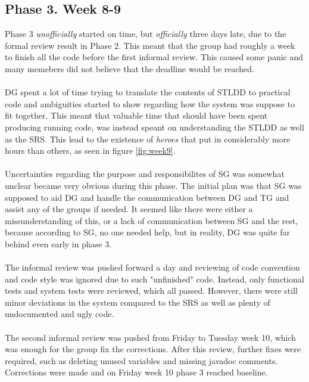 \documentclass{article}
\begin{document}
    \subsection{Phase 3. Week 8-9 \label{phase3}}
        Phase 3 \emph{unofficially} started on time, but \emph{officially} three days late, due to 
        the formal review result in Phase 2. This meant that the group had roughly a week to finish all 
        the code before the first informal review. This caused some panic and many memebers
        did not believe that the deadline would be reached.
        \\ \\
        DG spent a lot of time trying to translate the contents of STLDD to practical code 
        and ambiguities started to show regarding how the system was suppose to fit together.
        This meant that valuable time that should have been spent producing running code, was
        instead speant on understanding the STLDD as well as the SRS. This lead to the existence 
        of \emph{heroes} that put in considerably more hours than others, as seen in figure \ref{fig:week9}.
        \\ \\
        Uncertainties regarding the purpose and responsibilites of SG was somewhat unclear became very obvious
        during this phase. The initial plan was that SG was supposed to aid DG and handle the communication
        between DG and TG and assist any of the groups if needed. It seemed like there were either a 
        missunderstanding of this, or a lack of communication between SG and the rest, because according 
        to SG, no one needed help, but in reality, DG was quite far behind even early in phase 3.
        \\ \\
        The informal review was pushed forward a day and reviewing of code
        convention and code style was ignored due to such "unfinished" code. Instead, only
        functional tests and system tests were reviewed, which all passed. However, there
        were still minor deviations in the system compared to the SRS as well as plenty of 
        undocumented and ugly code. 
        \\ \\
        The second informal review was pushed from Friday to Tuesday week 10, which was enough
        for the group fix the corrections. After this review, further fixes were required,
        such as deleting unused variables and missing javadoc comments. Corrections were made
        and on Friday week 10 phase 3 reached baseline.
        
\end{document}
